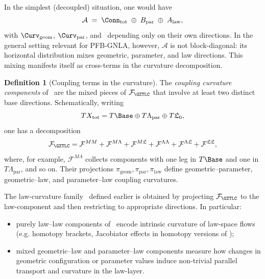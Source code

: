 \documentclass[11pt]{book}
\theoremstyle{plain}
\theoremstyle{definition}
\newtheorem{definition}[theorem]{Definition} \theoremstyle{remark}
\begin{document}
In the simplest (decoupled) situation, one would have
\[
   \mathcal{A}
   \;=\;
   \Conn_{\mathrm{tot}}
   \;\oplus\;
   B_{\mathrm{par}}
   \;\oplus\;
   A_{\mathrm{law}},
\]
with $\Curv_{\mathrm{geom}}$, $\Curv_{\mathrm{par}}$, and \GZLCurv\
depending only on their own directions. In the general setting relevant
for PFB-GNLA, however, $\mathcal{A}$ is not block-diagonal: its
horizontal distribution mixes geometric, parameter, and law
directions. This mixing manifests itself as cross-terms in the curvature
decomposition.

\begin{definition}[Coupling terms in the curvature]
  The \emph{coupling curvature components} of \GZTLC\ are the mixed
  pieces of $\mathcal{F}_{\GZTLC}$ that involve at least two distinct
  base directions. Schematically, writing
  \[
    T X_{\mathrm{tot}}
    =
    T\Base
    \oplus T\Lambda_{\mathrm{par}}
    \oplus T\mathfrak{L}_0,
  \]
  one has a decomposition
  \[
    \mathcal{F}_{\GZTLC}
    = \mathcal{F}^{MM}
      + \mathcal{F}^{M\Lambda}
      + \mathcal{F}^{M\mathfrak{L}}
      + \mathcal{F}^{\Lambda\Lambda}
      + \mathcal{F}^{\Lambda\mathfrak{L}}
      + \mathcal{F}^{\mathfrak{L}\mathfrak{L}},
  \]
  where, for example, $\mathcal{F}^{M\Lambda}$ collects components with
  one leg in $T\Base$ and one in $T\Lambda_{\mathrm{par}}$, and so on.
  Their projections
  $\pi_{\mathrm{geom}},\pi_{\mathrm{par}},\pi_{\mathrm{law}}$ define
  geometric–parameter, geometric–law, and parameter–law coupling
  curvatures.
\end{definition}


The law-curvature family \GZLCurv\ defined earlier is obtained by
projecting $\mathcal{F}_{\GZTLC}$ to the law-component and then
restricting to appropriate directions. In particular:

\begin{itemize}
  \item purely law–law components of \GZLCurv\ encode intrinsic
        curvature of law-space flows (e.g. homotopy brackets, Jacobiator
        effects in homotopy versions of \GAlgebra);
  \item mixed geometric–law and parameter–law components measure how
        changes in geometric configuration or parameter values induce
        non-trivial parallel transport and curvature in the law-layer.
\end{itemize}
\end{document}
